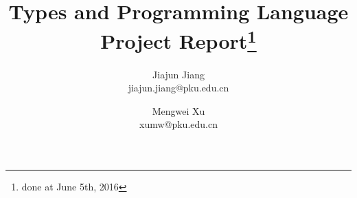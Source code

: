 \documentclass[a4paper,11pt]{article}
\begin{document}
    \title{Types and Programming Language Project Report\footnote{done at June 5th, 2016}}
    \author{Jiajun Jiang\\ jiajun.jiang@pku.edu.cn\\ 
        \and 
        Mengwei Xu\\ 
        xumw@pku.edu.cn\\ 
    } 
    \date{}
    \maketitle


    















 
\end{document}
